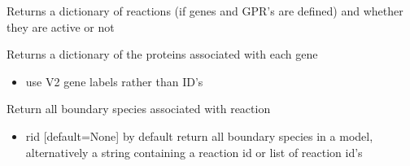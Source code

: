 \documentclass[letterpaper,10pt,english]{sphinxmanual}
\begin{document}
\begin{fulllineitems}
\begin{fulllineitems}
\begin{itemize}
\end{itemize}

\end{fulllineitems}


\begin{fulllineitems}
\label{\detokenize{modules_doc:cbmpy.CBModel.Model.getAllProteinActivities}}
\pysigstartsignatures
{}
\pysigstopsignatures
\sphinxAtStartPar
Returns a dictionary of reactions (if genes and GPR’s are defined) and whether they are active or not

\end{fulllineitems}


\begin{fulllineitems}
\label{\detokenize{modules_doc:cbmpy.CBModel.Model.getAllProteinGeneAssociations}}
\pysigstartsignatures
{}
\pysigstopsignatures
\sphinxAtStartPar
Returns a dictionary of the proteins associated with each gene
\begin{itemize}
\item {} 
\sphinxAtStartPar
{} use V2 gene labels rather than ID’s

\end{itemize}

\end{fulllineitems}


\begin{fulllineitems}
\label{\detokenize{modules_doc:cbmpy.CBModel.Model.getBoundarySpeciesIds}}
\pysigstartsignatures
{}
\pysigstopsignatures
\sphinxAtStartPar
Return all boundary species associated with reaction
\begin{itemize}
\item {} 
\sphinxAtStartPar
rid {[}default=None{]} by default return all boundary species in a model, alternatively a string containing a reaction id or list of reaction id’s


\end{itemize}
\end{fulllineitems}
\end{fulllineitems}
\end{document}
